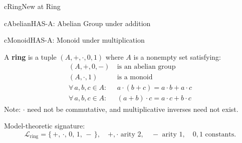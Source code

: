 \clearpage\thispagestyle{plain}

\begin{bpnew}{cRing}{New at Ring}
\end{bpnew}

\noindent
\begin{minipage}[t]{0.485\linewidth}
  \begin{bpinh}{cAbelian}{HAS-A: Abelian Group under addition}
  \end{bpinh}
\end{minipage}%
\hfill
\begin{minipage}[t]{0.485\linewidth}
  \begin{bpinh}{cMonoid}{HAS-A: Monoid under multiplication}
  \end{bpinh}
\end{minipage}

\begin{definition}[Ring]
  A \textbf{ring} is a tuple $(A, +, \cdot, 0, 1)$ where $A$ is a nonempty set
  satisfying:
  \begin{align*}
    (A,+,0,-)\  &\text{is an abelian group} \tag{Ab.\ Group under $+$}\\
    (A,\cdot,1)\ &\text{is a monoid} \tag{Monoid under $\cdot$}\\
    \forall\,a,b,c \in A:\ &a\cdot(b+c) = a\cdot b + a\cdot c \tag{Left Distributivity}\\
    \forall\,a,b,c \in A:\ &(a+b)\cdot c = a\cdot c + b\cdot c \tag{Right Distributivity}
  \end{align*}
  Note: $\cdot$ need not be commutative, and multiplicative inverses need not
  exist.

  \medskip\noindent
  Model-theoretic signature:
  \[
    \mathcal{L}_{\mathrm{ring}} = \{\,+,\,\cdot,\,0,\,1,\,-\,\},
    \quad +,\cdot \text{ arity } 2,\quad - \text{ arity } 1,\quad
    0,1 \text{ constants.}
  \]
\end{definition}

